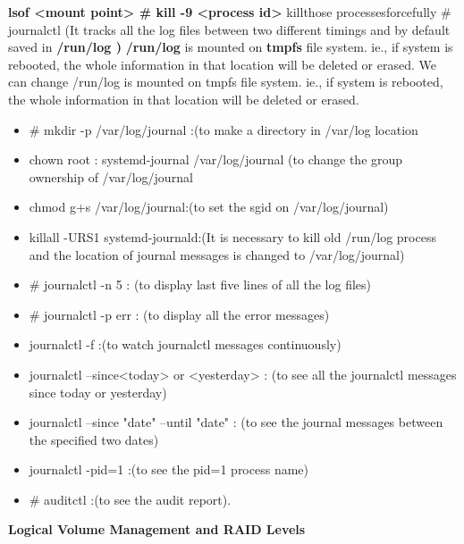 \begin{enumerate}
\begin{enumerate}
    \textbf{lsof  <mount point>   # kill   -9   <process id>} killthose processesforcefully   
    # journalctl	(It tracks all the log files between two different timings and by default saved in \textbf{ /run/log  )}
    \textbf{/run/log } is mounted on \textbf{ tmpfs} file system. ie., if system is rebooted, the whole information in that location will be deleted or  erased.
    We can change /run/log   is mounted on  tmpfs  file system. ie., if system is rebooted, the whole information in that location will   be deleted   or   erased.
      \begin{itemize}
        \item # mkdir    -p    /var/log/journal	:(to make a directory in   /var/log location
        \item chown    root : systemd-journal      /var/log/journal       (to change the group ownership of   /var/log/journal
        \item chmod    g+s    /var/log/journal:(to set the  sgid  on   /var/log/journal)
        \item killall    -URS1    systemd-journald:(It is necessary to kill old   /run/log   process   and the location of journal messages is changed to  /var/log/journal)
        \item # journalctl    -n    5		:	(to display last five lines of all the log files)
        \item # journalctl    -p   err		:	(to display all the error messages)
        \item journalctl    -f 	:(to watch journalctl messages continuously)
        \item journalctl     --since<today>   or   <yesterday>  :  (to see all the journalctl messages since today   or  yesterday) 
        \item journalctl     --since   "date"    --until    "date"  : (to see the journal messages between the specified two dates) 
        \item journalctl     -pid=1	:(to see the  pid=1  process name)
        \item # auditctl	:(to see the audit report).
      \end{itemize}
\end{enumerate}    


\bigskip
\bigskip

\textbf{Logical Volume Management and RAID Levels}

\bigskip
\bigskip


\end{enumerate}
